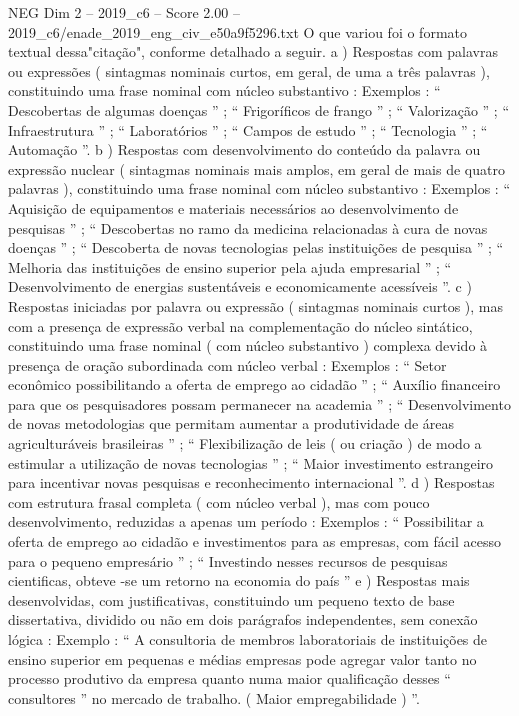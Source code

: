 \begin{textsample}{NEG Dim 2 – 2019\_c6 – Score 2.00 – 2019\_c6/enade\_2019\_eng\_civ\_e50a9f5296.txt}
O que variou foi o formato textual dessa"citação", conforme detalhado a seguir. a ) Respostas com palavras ou expressões ( sintagmas nominais curtos, em geral, de uma a três palavras ), constituindo uma frase nominal com núcleo substantivo : Exemplos : “ Descobertas de algumas doenças ” ; “ Frigoríficos de frango ” ; “ Valorização ” ; “ Infraestrutura ” ; “ Laboratórios ” ; “ Campos de estudo ” ; “ Tecnologia ” ; “ Automação ”. b ) Respostas com desenvolvimento do conteúdo da palavra ou expressão nuclear ( sintagmas nominais mais amplos, em geral de mais de quatro palavras ), constituindo uma frase nominal com núcleo substantivo : Exemplos : “ Aquisição de equipamentos e materiais necessários ao desenvolvimento de pesquisas ” ; “ Descobertas no ramo da medicina relacionadas à cura de novas doenças ” ; “ Descoberta de novas tecnologias pelas instituições de pesquisa ” ; “ Melhoria das instituições de ensino superior pela ajuda empresarial ” ; “ Desenvolvimento de energias sustentáveis e economicamente acessíveis ”. c ) Respostas iniciadas por palavra ou expressão ( sintagmas nominais curtos ), mas com a presença de expressão verbal na complementação do núcleo sintático, constituindo uma frase nominal ( com núcleo substantivo ) complexa devido à presença de oração subordinada com núcleo verbal : Exemplos : “ Setor econômico possibilitando a oferta de emprego ao cidadão ” ; “ Auxílio financeiro para que os pesquisadores possam permanecer na academia ” ; “ Desenvolvimento de novas metodologias que permitam aumentar a produtividade de áreas agriculturáveis brasileiras ” ; “ Flexibilização de leis ( ou criação ) de modo a estimular a utilização de novas tecnologias ” ; “ Maior investimento estrangeiro para incentivar novas pesquisas e reconhecimento internacional ”. d ) Respostas com estrutura frasal completa ( com núcleo verbal ), mas com pouco desenvolvimento, reduzidas a apenas um período : Exemplos : “ Possibilitar a oferta de emprego ao cidadão e investimentos para as empresas, com fácil acesso para o pequeno empresário ” ; “ Investindo nesses recursos de pesquisas cientificas, obteve -se um retorno na economia do país ” e ) Respostas mais desenvolvidas, com justificativas, constituindo um pequeno texto de base dissertativa, dividido ou não em dois parágrafos independentes, sem conexão lógica : Exemplo : “ A consultoria de membros laboratoriais de instituições de ensino superior em pequenas e médias empresas pode agregar valor tanto no processo produtivo da empresa quanto numa maior qualificação desses “ consultores ” no mercado de trabalho. ( Maior empregabilidade ) ”.

\end{textsample}

